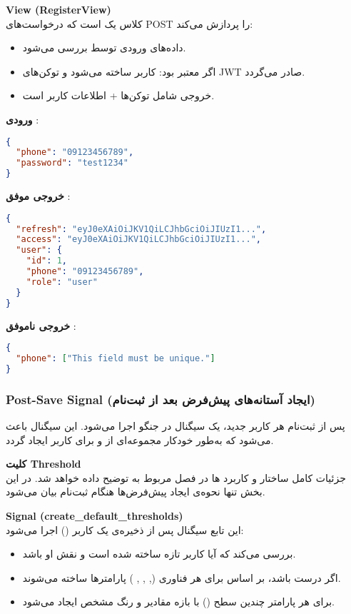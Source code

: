 \documentclass{report}
\begin{document}
\textbf{View (RegisterView)} \\
کلاس  یک  است که درخواست‌های POST را پردازش می‌کند:
\begin{itemize}
  \item داده‌های ورودی توسط  بررسی می‌شود.
  \item اگر معتبر بود: کاربر ساخته می‌شود و توکن‌های JWT صادر می‌گردد.
  \item خروجی شامل توکن‌ها + اطلاعات کاربر است.
\end{itemize}



\textbf{ورودی }:
\begin{lstlisting}[language=json]
{
  "phone": "09123456789",
  "password": "test1234"
}
\end{lstlisting}

\textbf{خروجی موفق }:
\begin{lstlisting}[language=json]
{
  "refresh": "eyJ0eXAiOiJKV1QiLCJhbGciOiJIUzI1...",
  "access": "eyJ0eXAiOiJKV1QiLCJhbGciOiJIUzI1...",
  "user": {
    "id": 1,
    "phone": "09123456789",
    "role": "user"
  }
}
\end{lstlisting}

\textbf{خروجی ناموفق }:
\begin{lstlisting}[language=json]
{
  "phone": ["This field must be unique."]
}
\end{lstlisting}
\subsubsection{Post-Save Signal (ایجاد آستانه‌های پیش‌فرض بعد از ثبت‌نام)}

پس از ثبت‌نام هر کاربر جدید، یک سیگنال  در جنگو اجرا می‌شود. این سیگنال باعث می‌شود که به‌طور خودکار مجموعه‌ای از  و  برای کاربر ایجاد گردد.

\textbf{کلیت Threshold} \\
جزئیات کامل ساختار و کاربرد ها در فصل مربوط به  توضیح داده خواهد شد. 
در این بخش تنها نحوه‌ی ایجاد پیش‌فرض‌ها هنگام ثبت‌نام بیان می‌شود.

\textbf{Signal (create\_default\_thresholds)} \\
این تابع سیگنال پس از ذخیره‌ی یک کاربر () اجرا می‌شود:
\begin{itemize}
  \item بررسی می‌کند که آیا کاربر تازه ساخته شده است و نقش او  باشد.
  \item اگر درست باشد، بر اساس  برای هر فناوری (, , , ) پارامترها ساخته می‌شوند.
  \item برای هر پارامتر چندین سطح () با بازه مقادیر و رنگ مشخص ایجاد می‌شود.
\end{itemize}
\end{document}

